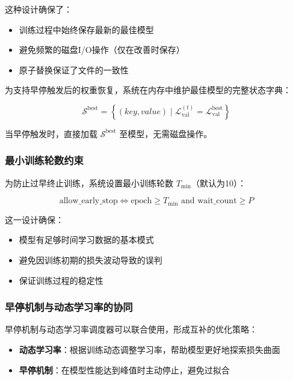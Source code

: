 \documentclass[UTF8, a4paper, 12pt]{article}
\begin{document}
这种设计确保了：
\begin{itemize}
    \item 训练过程中始终保存最新的最佳模型
    \item 避免频繁的磁盘I/O操作（仅在改善时保存）
    \item 原子替换保证了文件的一致性
\end{itemize}

为支持早停触发后的权重恢复，系统在内存中维护最佳模型的完整状态字典：

\begin{equation}
\mathcal{S}^{\text{best}} = \left\{ (key, value) \mid \mathcal{L}_{\text{val}}^{(t)} = \mathcal{L}_{\text{val}}^{\text{best}} \right\}
\end{equation}

当早停触发时，直接加载 $\mathcal{S}^{\text{best}}$ 至模型，无需磁盘操作。

\subsubsection{最小训练轮数约束}

为防止过早终止训练，系统设置最小训练轮数 $T_{\text{min}}$（默认为10）：

\begin{equation}
\text{allow\_early\_stop} \iff \text{epoch} \geq T_{\text{min}} \text{ and } \text{wait\_count} \geq P
\end{equation}

这一设计确保：
\begin{itemize}
    \item 模型有足够时间学习数据的基本模式
    \item 避免因训练初期的损失波动导致的误判
    \item 保证训练过程的稳定性
\end{itemize}

\subsubsection{早停机制与动态学习率的协同}

早停机制与动态学习率调度器可以联合使用，形成互补的优化策略：

\begin{itemize}
    \item \textbf{动态学习率}：根据训练动态调整学习率，帮助模型更好地探索损失曲面
    \item \textbf{早停机制}：在模型性能达到峰值时主动停止，避免过拟合
\end{itemize}
\end{document}
